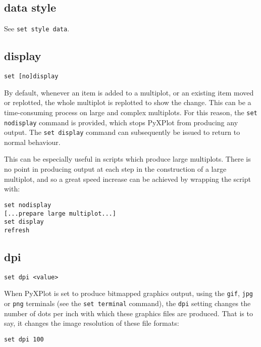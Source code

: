 \subsection{data style}

See {\tt set style data}.

\subsection{display}

\begin{verbatim}
set [no]display
\end{verbatim}

By default, whenever an item is added to a multiplot, or an existing item moved
or replotted, the whole multiplot is replotted to show the change. This can be
a time-consuming process on large and complex multiplots. For this reason, the
{\tt set nodisplay} command is provided, which stops PyXPlot from producing any
output. The {\tt set display} command can subsequently be issued to return to
normal behaviour.

This can be especially useful in scripts which produce large multiplots. There
is no point in producing output at each step in the construction of a large
multiplot, and so a great speed increase can be achieved by wrapping the script
with:

\begin{verbatim}
set nodisplay 
[...prepare large multiplot...] 
set display 
refresh
\end{verbatim}


\subsection{dpi}

\begin{verbatim}
set dpi <value>
\end{verbatim}

When PyXPlot is set to produce bitmapped graphics output, using the {\tt gif},
{\tt jpg} or {\tt png} terminals (see the {\tt set terminal} command), the
{\tt dpi} setting changes the number of dots per inch with which these
graphics files are produced. That is to say, it changes the image resolution of
these file formats:

\begin{verbatim}
set dpi 100
\end{verbatim}

